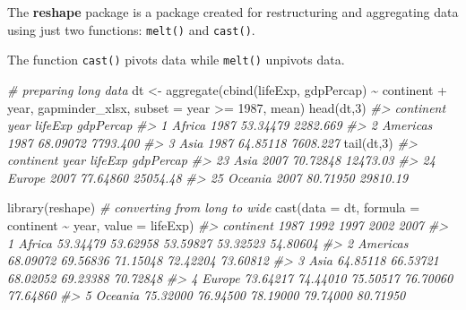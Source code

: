 \documentclass[
]{book}
\newenvironment{Shaded}{\begin{snugshade}}{\end{snugshade}}
\newcommand{\AttributeTok}[1]{\textcolor[rgb]{0.77,0.63,0.00}{#1}}
\newcommand{\CommentTok}[1]{\textcolor[rgb]{0.56,0.35,0.01}{\textit{#1}}}
\newcommand{\DecValTok}[1]{\textcolor[rgb]{0.00,0.00,0.81}{#1}}
\newcommand{\FunctionTok}[1]{\textcolor[rgb]{0.00,0.00,0.00}{#1}}
\newcommand{\NormalTok}[1]{#1}
\newcommand{\OtherTok}[1]{\textcolor[rgb]{0.56,0.35,0.01}{#1}}
\newcommand{\SpecialCharTok}[1]{\textcolor[rgb]{0.00,0.00,0.00}{#1}}
\newcommand{\StringTok}[1]{\textcolor[rgb]{0.31,0.60,0.02}{#1}}
\begin{document}
The \textbf{reshape} package is a package created for restructuring and aggregating data using just two functions: \texttt{melt()} and \texttt{cast()}.

The function \texttt{cast()} pivots data while \texttt{melt()} unpivots data.

\begin{Shaded}
\begin{Highlighting}[]
\CommentTok{\# preparing long data}
\NormalTok{dt }\OtherTok{\textless{}{-}} \FunctionTok{aggregate}\NormalTok{(}\FunctionTok{cbind}\NormalTok{(lifeExp, gdpPercap) }\SpecialCharTok{\textasciitilde{}}\NormalTok{ continent }\SpecialCharTok{+}\NormalTok{ year, }
\NormalTok{                gapminder\_xlsx, }
                \AttributeTok{subset =}\NormalTok{ year }\SpecialCharTok{\textgreater{}=} \DecValTok{1987}\NormalTok{, }
\NormalTok{                mean)}
\FunctionTok{head}\NormalTok{(dt,}\DecValTok{3}\NormalTok{)}
\CommentTok{\#\textgreater{}   continent year  lifeExp gdpPercap}
\CommentTok{\#\textgreater{} 1    Africa 1987 53.34479  2282.669}
\CommentTok{\#\textgreater{} 2  Americas 1987 68.09072  7793.400}
\CommentTok{\#\textgreater{} 3      Asia 1987 64.85118  7608.227}
\FunctionTok{tail}\NormalTok{(dt,}\DecValTok{3}\NormalTok{)}
\CommentTok{\#\textgreater{}    continent year  lifeExp gdpPercap}
\CommentTok{\#\textgreater{} 23      Asia 2007 70.72848  12473.03}
\CommentTok{\#\textgreater{} 24    Europe 2007 77.64860  25054.48}
\CommentTok{\#\textgreater{} 25   Oceania 2007 80.71950  29810.19}

\FunctionTok{library}\NormalTok{(reshape)}
\CommentTok{\# converting from long to wide}
\FunctionTok{cast}\NormalTok{(}\AttributeTok{data =}\NormalTok{ dt, }
     \AttributeTok{formula =}\NormalTok{ continent }\SpecialCharTok{\textasciitilde{}}\NormalTok{ year, }
     \AttributeTok{value =} \StringTok{\textquotesingle{}lifeExp\textquotesingle{}}\NormalTok{)}
\CommentTok{\#\textgreater{}   continent     1987     1992     1997     2002     2007}
\CommentTok{\#\textgreater{} 1    Africa 53.34479 53.62958 53.59827 53.32523 54.80604}
\CommentTok{\#\textgreater{} 2  Americas 68.09072 69.56836 71.15048 72.42204 73.60812}
\CommentTok{\#\textgreater{} 3      Asia 64.85118 66.53721 68.02052 69.23388 70.72848}
\CommentTok{\#\textgreater{} 4    Europe 73.64217 74.44010 75.50517 76.70060 77.64860}
\CommentTok{\#\textgreater{} 5   Oceania 75.32000 76.94500 78.19000 79.74000 80.71950}
\end{Highlighting}
\end{Shaded}
\end{document}
